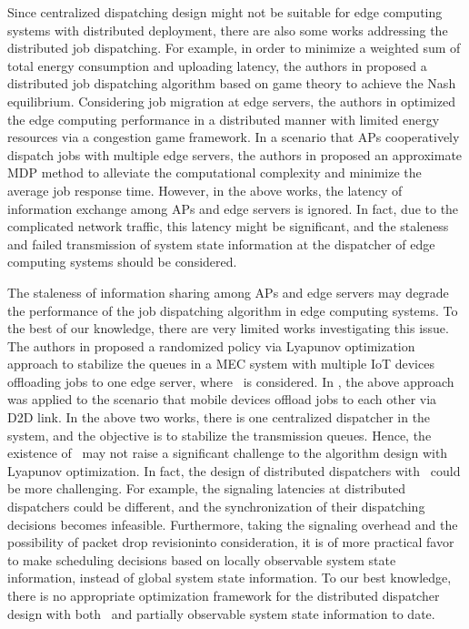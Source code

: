 Since centralized dispatching design might not be suitable for {edge computing systems} with distributed deployment, there are also some works addressing the distributed job dispatching.
For example, in order to minimize a weighted sum of total energy consumption and uploading latency, the authors in \cite{ToN-Xuchen2016} proposed a distributed job dispatching algorithm based on game theory to achieve the Nash equilibrium. 
Considering job migration at edge servers, the authors in \cite{ToN-xujie2018} optimized the edge computing performance in a distributed manner with limited energy resources via a congestion game framework.
In a scenario that APs cooperatively dispatch jobs with multiple edge servers, the authors in \cite{mdp-jcin} proposed {an} approximate MDP method to alleviate the computational complexity and minimize the average job response time.
However, in the above works, the latency of information exchange among APs and edge servers is ignored.
In fact, due to the complicated network traffic, this latency might be significant, and the staleness {and failed transmission} of system state information at the dispatcher of edge computing systems should be considered.

The staleness of information sharing among APs and edge servers may degrade the performance of the job dispatching algorithm in edge computing systems.
To the best of our knowledge, there are very limited works investigating this issue.
The authors in \cite{JSAC17-LyuX} proposed a randomized policy via Lyapunov optimization approach to stabilize the queues in a MEC system with multiple IoT devices offloading jobs to one edge server, where \brlatency~is considered. 
In \cite{TWC18-LyuX}, the above approach was applied to the scenario that mobile devices offload jobs to each other via D2D link.
In the above two works, there is one centralized dispatcher in the system, and the objective is to stabilize the transmission queues.
Hence, the existence of \brlatency~may not raise a significant challenge to the algorithm design with Lyapunov optimization.
In fact, the design of distributed dispatchers with \brlatency~could be more challenging.
For example, the signaling latencies at distributed dispatchers could be different, and the synchronization of their dispatching decisions becomes infeasible.
Furthermore, taking the signaling overhead and the possibility of packet drop revision{into} consideration, it is of more practical favor to make scheduling decisions based on locally observable system state information, instead of global system state information.
To our best knowledge, there is no appropriate optimization framework for the distributed dispatcher design with both \brlatency~and partially observable system state information to date.

